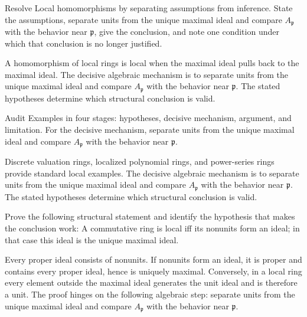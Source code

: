 \begin{problem}\label{prob:v08-problem-07}
Resolve Local homomorphisms by separating assumptions from inference. State the assumptions, separate units from the unique maximal ideal and compare \(A_{\mathfrak p}\) with the behavior near \(\mathfrak p\), give the conclusion, and note one condition under which that conclusion is no longer justified.
\end{problem}
\begin{solution}
A homomorphism of local rings is local when the maximal ideal pulls back to the maximal ideal. The decisive algebraic mechanism is to separate units from the unique maximal ideal and compare \(A_{\mathfrak p}\) with the behavior near \(\mathfrak p\). The stated hypotheses determine which structural conclusion is valid.
\end{solution}

\begin{problem}\label{prob:v08-problem-08}
Audit Examples in four stages: hypotheses, decisive mechanism, argument, and limitation. For the decisive mechanism, separate units from the unique maximal ideal and compare \(A_{\mathfrak p}\) with the behavior near \(\mathfrak p\).
\end{problem}
\begin{solution}
Discrete valuation rings, localized polynomial rings, and power-series rings provide standard local examples. The decisive algebraic mechanism is to separate units from the unique maximal ideal and compare \(A_{\mathfrak p}\) with the behavior near \(\mathfrak p\). The stated hypotheses determine which structural conclusion is valid.
\end{solution}

\begin{problem}\label{prob:v08-problem-09}
Prove the following structural statement and identify the hypothesis that makes the conclusion work: A commutative ring is local iff its nonunits form an ideal; in that case this ideal is the unique maximal ideal.
\end{problem}
\begin{solution}
Every proper ideal consists of nonunits. If nonunits form an ideal, it is proper and contains every proper ideal, hence is uniquely maximal. Conversely, in a local ring every element outside the maximal ideal generates the unit ideal and is therefore a unit. The proof hinges on the following algebraic step: separate units from the unique maximal ideal and compare \(A_{\mathfrak p}\) with the behavior near \(\mathfrak p\).
\end{solution}

